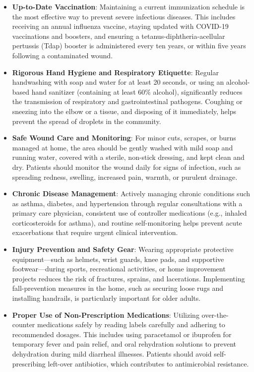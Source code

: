 \begin{itemize}
  \item \textbf{Up-to-Date Vaccination}: Maintaining a current immunization schedule is the most effective way to prevent severe infectious diseases. This includes receiving an annual influenza vaccine, staying updated with COVID-19 vaccinations and boosters, and ensuring a tetanus-diphtheria-acellular pertussis (Tdap) booster is administered every ten years, or within five years following a contaminated wound.
  \item \textbf{Rigorous Hand Hygiene and Respiratory Etiquette}: Regular handwashing with soap and water for at least 20 seconds, or using an alcohol-based hand sanitizer (containing at least 60\% alcohol), significantly reduces the transmission of respiratory and gastrointestinal pathogens. Coughing or sneezing into the elbow or a tissue, and disposing of it immediately, helps prevent the spread of droplets in the community.
  \item \textbf{Safe Wound Care and Monitoring}: For minor cuts, scrapes, or burns managed at home, the area should be gently washed with mild soap and running water, covered with a sterile, non-stick dressing, and kept clean and dry. Patients should monitor the wound daily for signs of infection, such as spreading redness, swelling, increased pain, warmth, or purulent drainage.
  \item \textbf{Chronic Disease Management}: Actively managing chronic conditions such as asthma, diabetes, and hypertension through regular consultations with a primary care physician, consistent use of controller medications (e.g., inhaled corticosteroids for asthma), and routine self-monitoring helps prevent acute exacerbations that require urgent clinical intervention.
  \item \textbf{Injury Prevention and Safety Gear}: Wearing appropriate protective equipment---such as helmets, wrist guards, knee pads, and supportive footwear---during sports, recreational activities, or home improvement projects reduces the risk of fractures, sprains, and lacerations. Implementing fall-prevention measures in the home, such as securing loose rugs and installing handrails, is particularly important for older adults.
  \item \textbf{Proper Use of Non-Prescription Medications}: Utilizing over-the-counter medications safely by reading labels carefully and adhering to recommended dosages. This includes using paracetamol or ibuprofen for temporary fever and pain relief, and oral rehydration solutions to prevent dehydration during mild diarrheal illnesses. Patients should avoid self-prescribing left-over antibiotics, which contributes to antimicrobial resistance.
\end{itemize}

